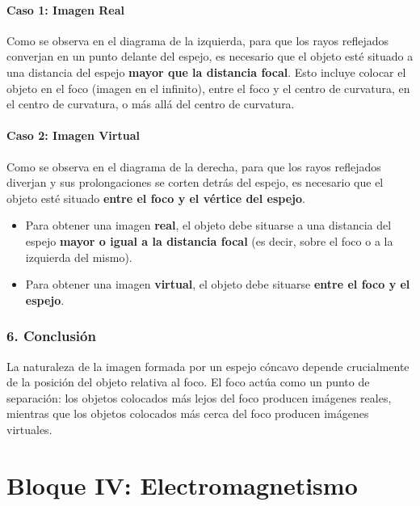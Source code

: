 \paragraph{Caso 1: Imagen Real}
Como se observa en el diagrama de la izquierda, para que los rayos reflejados converjan en un punto delante del espejo, es necesario que el objeto esté situado a una distancia del espejo \textbf{mayor que la distancia focal}. Esto incluye colocar el objeto en el foco (imagen en el infinito), entre el foco y el centro de curvatura, en el centro de curvatura, o más allá del centro de curvatura.

\paragraph{Caso 2: Imagen Virtual}
Como se observa en el diagrama de la derecha, para que los rayos reflejados diverjan y sus prolongaciones se corten detrás del espejo, es necesario que el objeto esté situado \textbf{entre el foco y el vértice del espejo}.

\begin{cajaresultado}
\begin{itemize}
    \item Para obtener una imagen \textbf{real}, el objeto debe situarse a una distancia del espejo \textbf{mayor o igual a la distancia focal} (es decir, sobre el foco o a la izquierda del mismo).
    \item Para obtener una imagen \textbf{virtual}, el objeto debe situarse \textbf{entre el foco y el espejo}.
\end{itemize}
\end{cajaresultado}

\subsubsection*{6. Conclusión}
\begin{cajaconclusion}
La naturaleza de la imagen formada por un espejo cóncavo depende crucialmente de la posición del objeto relativa al foco. El foco actúa como un punto de separación: los objetos colocados más lejos del foco producen imágenes reales, mientras que los objetos colocados más cerca del foco producen imágenes virtuales.
\end{cajaconclusion}

\newpage

\section{Bloque IV: Electromagnetismo}
\label{sec:em_2011_sep_ext}

